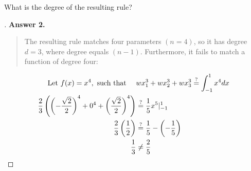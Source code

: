 \documentclass[12pt]{article}
\newenvironment{exercise}[2][Exercise]{\begin{trivlist}
\item[\hskip \labelsep {\bfseries #1}\hskip \labelsep {\bfseries #2.}]}{\end{trivlist}}
\begin{document}
\pagebreak
\begin{exercise}{2}
	What is the degree of the resulting rule?
\end{exercise} %
\begin{proof}[]
	\textbf{Answer 2.} %
	\begin{quote}
		The resulting rule matches four parameters $(n = 4)$, so it has degree $\boxed{d = 3}$, where degree equals $(n-1)$. Furthermore, it fails to match a function of degree four:
	\end{quote}
	\begin{align*}
		\textnormal{Let } f(x) = x^4, \textnormal{ such that } \quad &
		w x_1^3 + w x_2^3 + w x_3^3 \stackrel{?}{=} \int_{-1}^{1} x^4 dx \\
		\frac{2}{3} \left( \left( -\frac{\sqrt{2}}{2}\right)^4 + 0^4 + \left( \frac{\sqrt{2}}{2}\right)^4  \right) &\stackrel{?}{=} \frac{1}{5}x^5|_{-1}^{1} \\
		\frac{2}{3} \left( \frac{1}{2} \right) &\stackrel{?}{=} \frac{1}{5} - \left( -\frac{1}{5} \right) \\
		\frac{1}{3} &\neq \frac{2}{5}
	\end{align*}
\end{proof}
\end{document}
